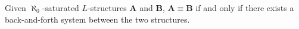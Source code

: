 Given $\aleph_0$-saturated $L$-structures $\mathbf{A}$ and $\mathbf{B}$, $\mathbf{A} \equiv \mathbf{B}$ if and only if there exists a back-and-forth system between the two structures.
